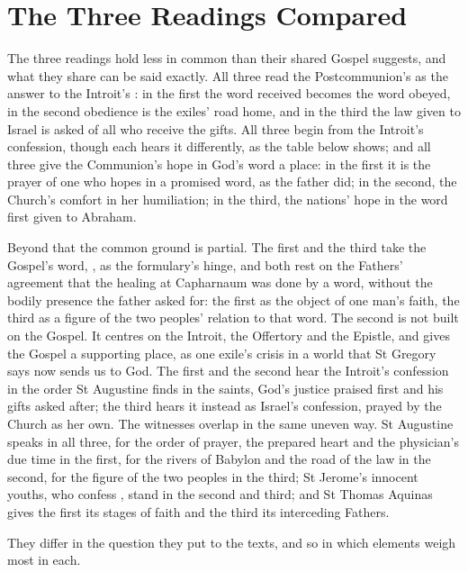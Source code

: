 \section{The Three Readings Compared}
\label{sec:comparison}

The three readings hold less in common than their shared Gospel suggests, and
what they share can be said exactly. All three read the Postcommunion's
 as the answer to the Introit's : in the first the word received becomes the word obeyed, in the
second obedience is the exiles' road home, and in the third the law given to
Israel is asked of all who receive the gifts. All three begin from the Introit's
confession, though each hears it differently, as the table below shows; and all
three give the Communion's hope in God's word a place: in the first it is the
prayer of one who hopes in a promised word, as the father did; in the second,
the Church's comfort in her humiliation; in the third, the nations' hope in the
word first given to Abraham.

Beyond that the common ground is partial. The first and the third take the
Gospel's word, , as the formulary's hinge, and both
rest on the Fathers' agreement that the healing at Capharnaum was done by a
word, without the bodily presence the father asked for: the first as the object
of one man's faith, the third as a figure of the two peoples' relation to that
word. The second is not built on the Gospel. It centres on the Introit, the
Offertory and the Epistle, and gives the Gospel a supporting place, as one
exile's crisis in a world that St Gregory says now sends us to God. The first
and the second hear the Introit's confession in the order St Augustine finds in
the saints, God's justice praised first and his gifts asked after; the third
hears it instead as Israel's confession, prayed by the Church as her own. The
witnesses overlap in the same uneven way. St Augustine speaks in all three, for
the order of prayer, the prepared heart and the physician's due time in the
first, for the rivers of Babylon and the road of the law in the second, for the
figure of the two peoples in the third; St Jerome's innocent youths, who
confess , stand in the second and third; and St Thomas
Aquinas gives the first its stages of faith and the third its interceding
Fathers.

They differ in the question they put to the texts, and so in which elements
weigh most in each.

